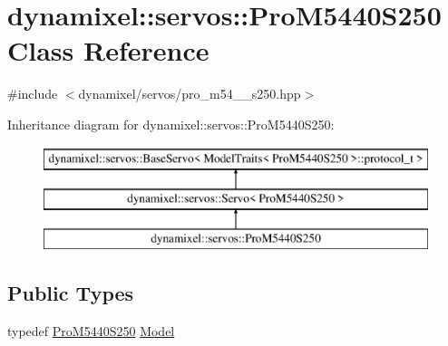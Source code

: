 \hypertarget{classdynamixel_1_1servos_1_1_pro_m5440_s250}{}\section{dynamixel\+:\+:servos\+:\+:Pro\+M5440\+S250 Class Reference}
\label{classdynamixel_1_1servos_1_1_pro_m5440_s250}


{\ttfamily \#include $<$dynamixel/servos/pro\+\_\+m54\+\_\+\_\+s250.\+hpp$>$}

Inheritance diagram for dynamixel\+:\+:servos\+:\+:Pro\+M5440\+S250\+:\begin{figure}[H]
\begin{center}
\leavevmode
\includegraphics[height=3.000000cm]{classdynamixel_1_1servos_1_1_pro_m5440_s250}
\end{center}
\end{figure}
\subsection*{Public Types}
\begin{DoxyCompactItemize}
\item 
typedef \hyperlink{classdynamixel_1_1servos_1_1_pro_m5440_s250}{Pro\+M5440\+S250} \hyperlink{classdynamixel_1_1servos_1_1_pro_m5440_s250_aecd5e7e0060cb016819ad8b92e049e6c}{Model}
\end{DoxyCompactItemize}

